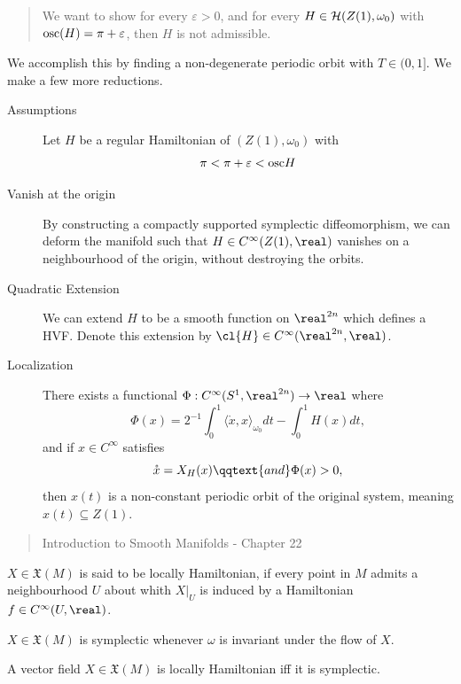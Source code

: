 \documentclass[../main-v2-manifolds.tex]{subfiles}
\begin{document}
\clearpage
{}
\begin{quote}
    We want to show for every $\varepsilon>0$, and for every $H\in\mathcal{H}(Z(1),\omega_0)$ with $\mathrm{osc}(H) = \pi + \varepsilon$, then $H$ is not admissible. 
\end{quote}
We accomplish this by finding a non-degenerate periodic orbit with $T\in (0,1]$. We make a few more reductions.
\begin{description}
    \item[Assumptions] Let $H$ be a regular Hamiltonian of $(Z(1),\omega_0)$ with 
    \[
        \pi < \pi + \varepsilon < \mathrm{osc}{H}
    \]
    \item[Vanish at the origin] By constructing a compactly supported symplectic diffeomorphism, we can deform the manifold such that $H\in C^\infty(Z(1),\real)$ vanishes on a neighbourhood of the origin, without destroying the orbits.
    \item[Quadratic Extension] We can extend $H$ to be a smooth function on $\realtn$ which defines a HVF. Denote this extension by $\cl{H}\in C^\infty(\realtn,\real)$.
    \item[Localization] There exists a functional $\Phi: C^\infty(S^1,\realtn)\to\real$ where
    \[
        \Phi(x) = 2^{-1}\int_0^1 \langle\mathring{x},x\rangle_{\omega_0}dt - \int_0^1 H(x)dt,
    \]
    and if $x\in C^\infty$ satisfies
    \[
        \mathring{x} = X_H(x)\qqtext{and}\Phi(x)>0,
    \]
    then $x(t)$ is a non-constant periodic orbit of the original system, meaning $x(t)\subseteq Z(1)$.
\end{description}
\begin{quote}
    Introduction to Smooth Manifolds - Chapter 22
\end{quote}
\begin{definition}
    $X\in \mathfrak{X}(M)$ is said to be locally Hamiltonian, if every point in $M$ admits a neighbourhood $U$ about whith $X\vert_U$ is induced by a Hamiltonian $f\in C^\infty(U,\real)$.
\end{definition}
\begin{definition}
    $X\in\mathfrak{X}(M)$ is symplectic whenever $\omega$ is invariant under the flow of $X$.
\end{definition}
\begin{wts}
    A vector field $X\in\mathfrak{X}(M)$ is locally Hamiltonian iff it is symplectic.
\end{wts}
\end{document}

